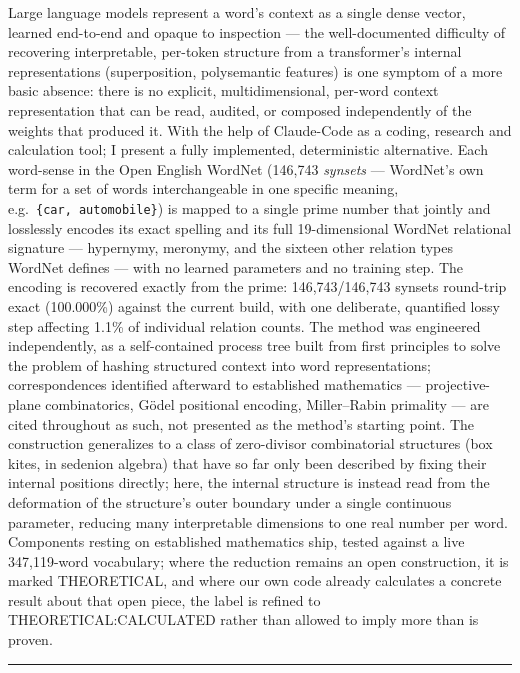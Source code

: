\documentclass[
  10pt,
]{article}
\begin{document}
Large language models represent a word's context as a single dense
vector, learned end-to-end and opaque to inspection --- the
well-documented difficulty of recovering interpretable, per-token
structure from a transformer's internal representations (superposition,
polysemantic features) is one symptom of a more basic absence: there is
no explicit, multidimensional, per-word context representation that can
be read, audited, or composed independently of the weights that produced
it. With the help of Claude-Code as a coding, research and calculation
tool; I present a fully implemented, deterministic alternative. Each
word-sense in the Open English WordNet (146,743 \emph{synsets} ---
WordNet's own term for a set of words interchangeable in one specific
meaning, e.g.~\texttt{\{car,\ automobile\}}) is mapped to a single prime
number that jointly and losslessly encodes its exact spelling and its
full 19-dimensional WordNet relational signature --- hypernymy,
meronymy, and the sixteen other relation types WordNet defines --- with
no learned parameters and no training step. The encoding is recovered
exactly from the prime: 146,743/146,743 synsets round-trip exact
(100.000\%) against the current build, with one deliberate, quantified
lossy step affecting 1.1\% of individual relation counts. The method was
engineered independently, as a self-contained process tree built from
first principles to solve the problem of hashing structured context into
word representations; correspondences identified afterward to
established mathematics --- projective-plane combinatorics, Gödel
positional encoding, Miller--Rabin primality --- are cited throughout as
such, not presented as the method's starting point. The construction
generalizes to a class of zero-divisor combinatorial structures (box
kites, in sedenion algebra) that have so far only been described by
fixing their internal positions directly; here, the internal structure
is instead read from the deformation of the structure's outer boundary
under a single continuous parameter, reducing many interpretable
dimensions to one real number per word. Components resting on
established mathematics ship, tested against a live 347,119-word
vocabulary; where the reduction remains an open construction, it is
marked THEORETICAL, and where our own code already calculates a concrete
result about that open piece, the label is refined to
THEORETICAL:CALCULATED rather than allowed to imply more than is proven.

\begin{center}\rule{0.5\linewidth}{0.5pt}\end{center}
\end{document}
